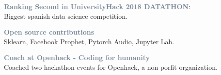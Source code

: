 \textcolor{SlateGrey}{\textbf{Ranking Second in UniversityHack 2018 DATATHON}}: \\ Biggest spanish data science competition.
\newline


\textcolor{SlateGrey}{\textbf{Open source contributions}} \\ Sklearn, Facebook Prophet, Pytorch Audio, Jupyter Lab.
\newline


\textcolor{SlateGrey}{\textbf{Coach at Openhack - Coding for humanity}} \\ Coached two hackathon events for Openhack, a non-porfit organization.




